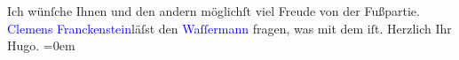            \pstart
           Ich wünſche Ihnen und den andern möglichſt viel Freude von der Fußpartie.\pend
           \pstart
           \textcolor{blue}{Clemens Franckenstein}{}\ledrightnote{\textcolor{blue}{Clemens von Franckenstein}}{ }{\pb}läſst den \textcolor{blue}{Waſſermann}{}\ledrightnote{\textcolor{blue}{Jakob Wassermann}} fragen, was mit dem \label{K_L00955_1v}\label{K_L00955_1h} iſt.\pend
           \pstart
           Herzlich Ihr{\\[\baselineskip]}\spacefill\mbox{Hugo.}\pend
           \leftskip=0em{}\endnumbering{}  
      